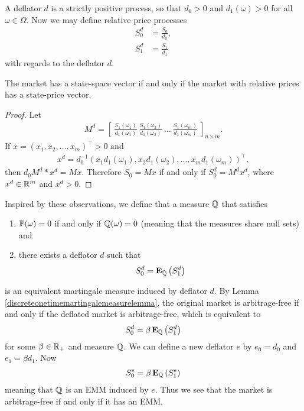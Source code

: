 A deflator $d$ is a strictly positive process, so that $d_0 > 0$ and $d_1(\omega) > 0$ for all $\omega \in \Omega$. Now we may define relative price processes
\begin{align}
S^d_0 &= \frac{S_0}{d_0}, \\
S^d_1 &= \frac{S_1}{d_1}
\end{align}
with regards to the deflator $d$.

\begin{lemma}
	\label{discreteonetimemartingalemeasurelemma}
	The market has a state-space vector if and only if the market with relative prices has a state-price vector.
\end{lemma}

\begin{proof}
	Let
	\begin{align}
	M^d = \left[ \ \frac{S_1 ( \omega_1 )}{ d_1 (\omega_1) } \ \frac{S_1 ( \omega_2 )}{ d_1 (\omega_2) } \ \ldots \ \frac{S_1  ( \omega_m )}{ d_1 (\omega_m) } \ \right]_{n \times m} .
	\end{align}
	If $x = (x_1, x_2, \ldots , x_m)^{\top} > 0$ and
	\begin{align}
	x^d = d_0^{-1} ( x_1 d_1 (\omega_1), x_2 d_1 (\omega_2), \ldots , x_m d_1 (\omega_m) )^{\top},
	\end{align}
	then $d_0 M^d* x^d = Mx$. Therefore $S_0 = Mx$ if and only if $S^d_0 = M^d x^d$, where $x^d \in \mathbb{R}^m$ and $x^d > 0$.
\end{proof}  
  
Inspired by these observations, we define that a measure $\mathbb{Q}$ that satisfies 
  \begin{enumerate}[labelindent=\parindent, leftmargin=*]
    \item $\mathbb{P}( \omega ) = 0$ if and only if $\mathbb{Q} ( \omega ) = 0$ (meaning that the measures share null sets) and
    \item there exists a deflator $d$ such that 
    \begin{align}
    		S^d_0 = \operatorname{\boldsymbol{\mathrm{E}}}_{\mathbb{Q}} \left( S^d_1 \right)
   	 \end{align}
  \end{enumerate}
is an equivalent martingale measure induced by deflator $d$. By Lemma \ref{discreteonetimemartingalemeasurelemma}, the original market is arbitrage-free if and only if the deflated market is arbitrage-free, which is equivalent to
    \begin{align}
		S^d_0 = \beta \operatorname{\boldsymbol{\mathrm{E}}}_{\mathbb{Q}} \left( S^d_1 \right)
	\end{align}
for some $\beta \in \mathbb{R}_+$ and measure $\mathbb{Q}$. We can define a new deflator $e$ by $e_0 = d_0$ and $e_1 = \beta d_1$. Now
    \begin{align}
		S^e_0 = \beta \operatorname{\boldsymbol{\mathrm{E}}}_{\mathbb{Q}} \left( S^e_1 \right)
	\end{align}
meaning that $\mathbb{Q}$ is an EMM induced by $e$. Thus we see that the market is arbitrage-free if and only if it has an EMM.


